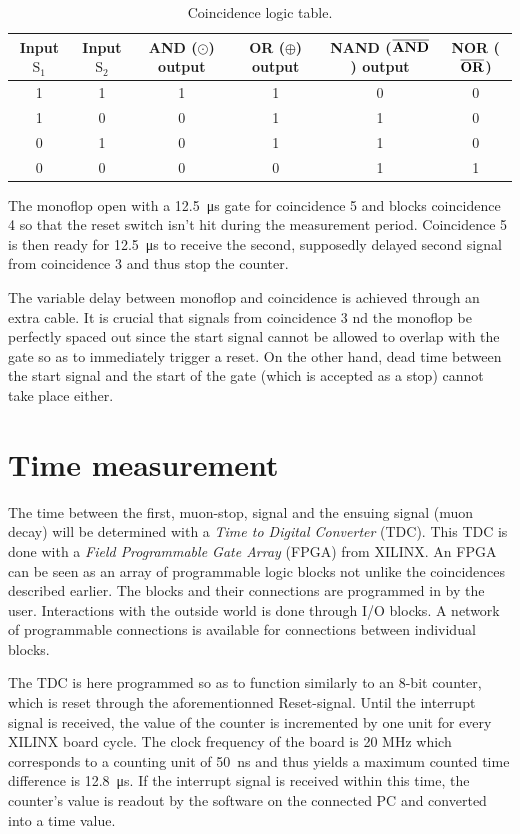 \begin{table}
\begin{tabular}{|c|c|c|c|c|c|}
\hline
Input $\text{S}_1$ & Input $\text{S}_2$ & \textbf{AND} ($\odot$) output & \textbf{OR} ($\oplus$) output & \textbf{NAND} ($\overline{\text{\textbf{AND}}}$) output & \textbf{NOR} ($\overline{\text{\textbf{OR}}}$) \\ \hline
1 & 1 & 1 & 1 & 0 & 0 \\
1 & 0 & 0 & 1 & 1 & 0 \\
0 & 1 & 0 & 1 & 1 & 0 \\
0 & 0 & 0 & 0 & 1 & 1 \\ \hline
\end{tabular}
\caption{Coincidence logic table.}
\label{tab:log}
\end{table}


The monoflop open with a \SI{12.5}{\micro\second} gate for coincidence 5 and blocks coincidence 4 so that the reset switch isn't hit during the measurement period. Coincidence 5 is then ready for \SI{12.5}{\micro\second} to receive the second, supposedly delayed second signal from coincidence 3 and thus stop the counter.

The variable delay between monoflop and coincidence is achieved through an extra cable. It is crucial that signals from coincidence 3 nd the monoflop be perfectly spaced out since the start signal cannot be allowed to overlap with the gate so as to immediately trigger a reset. On the other hand, dead time between the start signal and the start of the gate (which is accepted as a stop) cannot take place either.

\section{Time measurement}

The time between the first, muon-stop, signal and the ensuing signal (muon decay) will be determined with a \textit{Time to Digital Converter} (TDC). This TDC is done with a \textit{Field Programmable Gate Array} (FPGA) from XILINX. An FPGA can be seen as an array of programmable logic blocks not unlike the coincidences described earlier. The blocks and their connections are programmed in by the user. Interactions with the outside world is done through I/O blocks. A network of programmable connections is available for connections between individual blocks.

The TDC is here programmed so as to function similarly to an 8-bit counter, which is reset through the aforementionned Reset-signal. Until the interrupt signal is received, the value of the counter is incremented by one unit for every XILINX board cycle. The clock frequency of the board is 20 MHz which corresponds to a counting unit of \SI{50}{\nano\second} and thus yields a maximum counted time difference is \SI{12.8}{\micro\second}. If the interrupt signal is received within this time, the counter's value is readout by the software on the connected PC	and converted into a time value.


